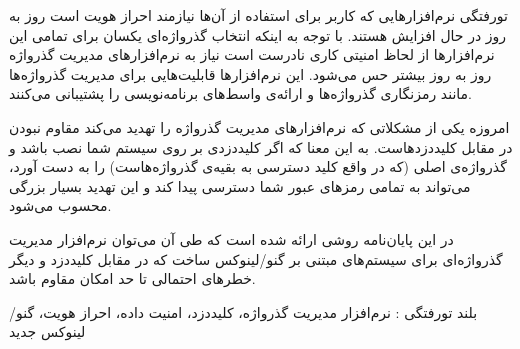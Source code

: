 


\pagestyle{empty}

‌تورفتگی
نرم‌افزارهایی که کاربر برای استفاده از آن‌ها نیازمند احراز هویت است روز به روز در حال افزایش هستند. با توجه به اینکه انتخاب گذرواژه‌ای یکسان برای تمامی این نرم‌افزارها از لحاظ امنیتی کاری نادرست است نیاز به نرم‌افزارهای مدیریت گذرواژه روز به روز بیشتر حس می‌شود. این نرم‌افزارها قابلیت‌هایی برای مدیریت گذرواژه‌ها مانند رمزنگاری گذرواژه‌ها و ارائه‌ی واسط‌های برنامه‌نویسی را پشتیبانی می‌کنند.

امروزه یکی از مشکلاتی که نرم‌افزارهای مدیریت گذرواژه را تهدید می‌کند مقاوم نبودن در مقابل کلیددزدهاست. به این معنا که اگر کلیددزدی بر روی سیستم شما نصب باشد و گذرواژه‌ی اصلی (که در واقع کلید دسترسی به بقیه‌ی گذرواژ‌ه‌هاست) را به دست آورد، می‌تواند به تمامی رمز‌های عبور شما دسترسی پیدا کند و این تهدید بسیار بزرگی محسوب می‌شود.
 
در این پایان‌نامه روشی ارائه شده است که طی آن می‌توان نرم‌افزار مدیریت گذرواژه‌ای برای سیستم‌های مبتنی بر گنو/لینوکس ساخت که در مقابل کلید‌دزد و دیگر خطر‌های احتمالی تا حد امکان مقاوم باشد.
 
‌بلند
‌تورفتگی : 
نرم‌افزار مدیریت گذرواژه، کلید‌دزد، امنیت داده، احراز هویت، گنو/لینوکس
‌جدید
